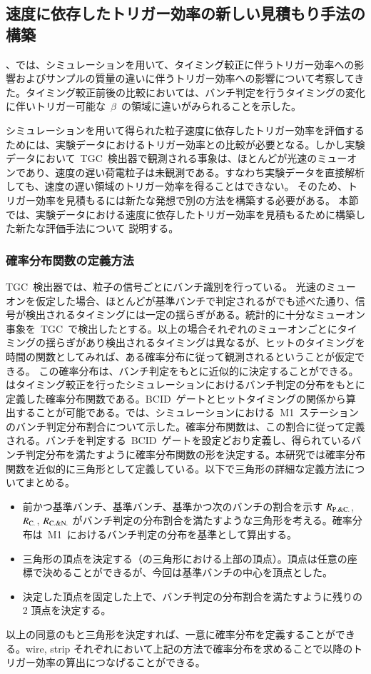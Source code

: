 \subsection{速度に依存したトリガー効率の新しい見積もり手法の構築}\label{sec:est}
、では、シミュレーションを用いて、タイミング較正に伴うトリガー効率への影響およびサンプルの質量の違いに伴うトリガー効率への影響について考察してきた。タイミング較正前後の比較においては、バンチ判定を行うタイミングの変化に伴いトリガー可能な~$\beta$~の領域に違いがみられることを示した。

シミュレーションを用いて得られた粒子速度に依存したトリガー効率を評価するためには、実験データにおけるトリガー効率との比較が必要となる。しかし実験データにおいて~TGC~検出器で観測される事象は、ほとんどが光速のミューオンであり、速度の遅い荷電粒子は未観測である。すなわち実験データを直接解析しても、速度の遅い領域のトリガー効率を得ることはできない。
そのため、トリガー効率を見積もるには新たな発想で別の方法を構築する必要がある。
本節では、実験データにおける速度に依存したトリガー効率を見積もるために構築した新たな評価手法について
説明する。
\subsubsection{確率分布関数の定義方法}\label{sec:pro}
TGC~検出器では、粒子の信号ごとにバンチ識別を行っている。
光速のミューオンを仮定した場合、ほとんどが基準バンチで判定されるがでも述べた通り、信号が検出されるタイミングには一定の揺らぎがある。統計的に十分なミューオン事象を~TGC~で検出したとする。以上の場合それぞれのミューオンごとにタイミングの揺らぎがあり検出されるタイミングは異なるが、ヒットのタイミングを時間の関数としてみれば、ある確率分布に従って観測されるということが仮定できる。
この確率分布は、バンチ判定をもとに近似的に決定することができる。はタイミング較正を行ったシミュレーションにおけるバンチ判定の分布をもとに定義した確率分布関数である。BCID~ゲートとヒットタイミングの関係から算出することが可能である。では、シミュレーションにおける~M1~ステーションのバンチ判定分布割合について示した。確率分布関数は、この割合に従って定義される。バンチを判定する~BCID~ゲートを設定どおり定義し、得られているバンチ判定分布を満たすように確率分布関数の形を決定する。本研究では確率分布関数を近似的に三角形として定義している。以下で三角形の詳細な定義方法についてまとめる。
\begin{itemize}
\item 前かつ基準バンチ、基準バンチ、基準かつ次のバンチの割合を示す $\it{R}_{\rm{P.\& C.}}$, $\it{R}_{\rm{C.}}$, $\it{R}_{\rm{C.\& N.}}$ がバンチ判定の分布割合を満たすような三角形を考える。確率分布は~M1~におけるバンチ判定の分布を基準として算出する。
\item 三角形の頂点を決定する（の三角形における上部の頂点）。頂点は任意の座標で決めることができるが、今回は基準バンチの中心を頂点とした。
\item 決定した頂点を固定した上で、バンチ判定の分布割合を満たすように残りの 2 頂点を決定する。
\end{itemize}
以上の同意のもと三角形を決定すれば、一意に確率分布を定義することができる。wire, strip それぞれにおいて上記の方法で確率分布を求めることで以降のトリガー効率の算出につなげることができる。

